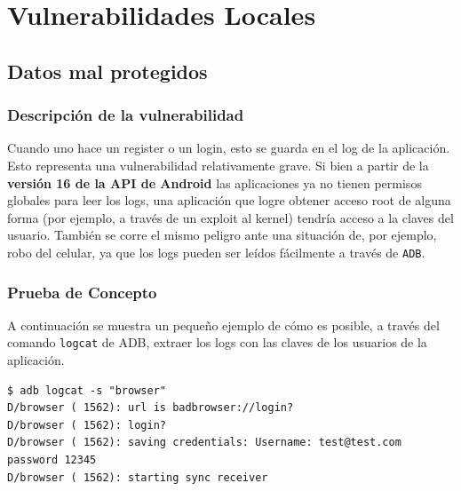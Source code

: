 \documentclass[11pt, a4paper, twoside]{article}
\begin{document}
\clearpage{\pagestyle{empty}}

\clearpage{%
  \pagestyle{empty}\tableofcontents%
  \vspace{3cm}%
  \cleardoublepage%
}
\setcounter{page}{1}

%
%
\section{Vulnerabilidades Locales}
%
%
\subsection{Datos mal protegidos}

\subsubsection{Descripción de la vulnerabilidad}
Cuando uno hace un register o un login, esto se guarda en el log de la aplicación. Esto representa una vulnerabilidad relativamente grave. Si bien a partir de la \textbf{versión 16 de la API de Android} las aplicaciones ya no tienen permisos globales para leer los logs, una aplicación que logre obtener acceso root de alguna forma (por ejemplo, a través de un exploit al kernel) tendría acceso a la claves del usuario. También se corre el mismo peligro ante una situación de, por ejemplo, robo del celular, ya que los logs pueden ser leídos fácilmente a través de \texttt{ADB}.

\subsubsection{Prueba de Concepto}
A continuación se muestra un pequeño ejemplo de cómo es posible, a través del comando \texttt{logcat} de ADB, extraer los logs con las claves de los usuarios de la aplicación.

\begin{Verbatim}[frame=single]
$ adb logcat -s "browser"
D/browser ( 1562): url is badbrowser://login?
D/browser ( 1562): login?
D/browser ( 1562): saving credentials: Username: test@test.com password 12345
D/browser ( 1562): starting sync receiver
\end{Verbatim}

%
%
\clearpage
\end{document}
